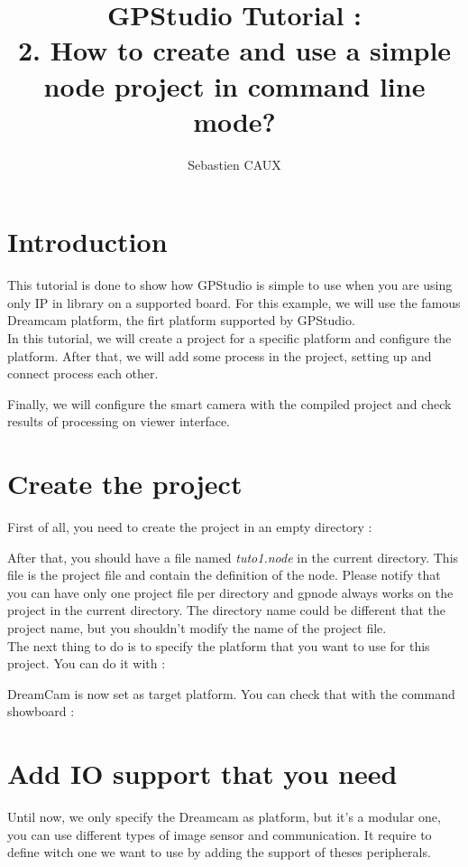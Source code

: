 \documentclass[10pt,a4paper]{article}
\author{Sebastien CAUX}
\title{GPStudio Tutorial \version : \\ 2. How to create and use a simple node project in command line mode?}
\begin{document}
\maketitle
\section{Introduction}
This tutorial is done to show how GPStudio is simple to use when you are using only IP in library on a supported board. For this example, we will use the famous Dreamcam platform, the firt platform supported by GPStudio.\\

In this tutorial, we will create a project for a specific platform and configure the platform. After that, we will add some process in the project, setting up and connect process each other.

Finally, we will configure the smart camera with the compiled project and check results of processing on viewer interface.

\section{Create the project}
First of all, you need to create the project in an empty directory :


After that, you should have a file named \emph{tuto1.node} in the current directory. This file is the project file and contain the definition of the node. Please notify that you can have only one project file per directory and gpnode always works on the project in the current directory. The directory name could be different that the project name, but you shouldn't modify the name of the project file.\\

The next thing to do is to specify the platform that you want to use for this project. You can do it with :


DreamCam is now set as target platform. You can check that with the command showboard :


\section{Add IO support that you need}
Until now, we only specify the Dreamcam as platform, but it's a modular one, you can use different types of image sensor and communication. It require to define witch one we want to use by adding the support of theses peripherals. \\
\end{document}
